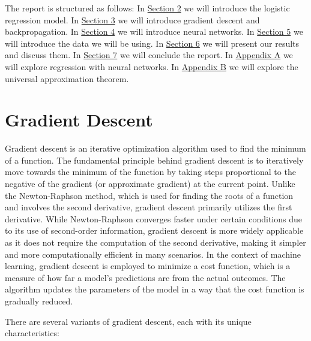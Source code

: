 \documentclass[twoside,11pt]{report}
\begin{document}
    \noindent
    The report is structured as follows: 
    In \hyperref[sec:logistic]{Section 2} we will introduce the logistic regression model.
    In \hyperref[sec:GD]{Section 3} we will introduce gradient descent and backpropagation. 
    In \hyperref[sec:NN]{Section 4} we will introduce neural networks. 
    In \hyperref[sec:data]{Section 5} we will introduce the data we will be using.
    In \hyperref[sec:resultsdiscussion]{Section 6} we will present our results and discuss them. 
    In \hyperref[sec:conclusion]{Section 7} we will conclude the report. 
    In \hyperref[app:appendixA]{Appendix A} we will explore regression with neural networks.
    In \hyperref[app:appendixB]{Appendix B} we will explore the universal approximation theorem. 







\section{Gradient Descent}
\label{sec:GD}

    Gradient descent is an iterative optimization algorithm used to find the minimum of a function. 
    The fundamental principle behind gradient descent is to iteratively move towards the minimum of the 
    function by taking steps proportional to the negative of the gradient (or approximate gradient) at the current point.
    Unlike the Newton-Raphson method, which is used for finding the roots of a function and involves the second 
    derivative, gradient descent primarily utilizes the first derivative. While Newton-Raphson converges faster 
    under certain conditions due to its use of second-order information, gradient descent is more widely applicable 
    as it does not require the computation of the second derivative, making it simpler and more computationally 
    efficient in many scenarios.
    In the context of machine learning, gradient descent is employed to minimize a cost function, which is a 
    measure of how far a model's predictions are from the actual outcomes. The algorithm updates the parameters 
    of the model in a way that the cost function is gradually reduced.

    There are several variants of gradient descent, each with its unique characteristics:
\end{document}
